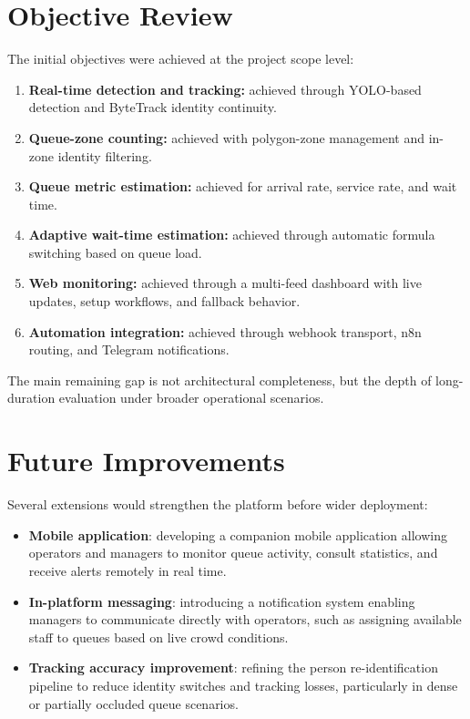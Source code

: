 \section{Objective Review}
The initial objectives were achieved at the project scope level:
\begin{enumerate}
    \item \textbf{Real-time detection and tracking:} achieved through YOLO-based detection and ByteTrack identity continuity.
    \item \textbf{Queue-zone counting:} achieved with polygon-zone management and in-zone identity filtering.
    \item \textbf{Queue metric estimation:} achieved for arrival rate, service rate, and wait time.
    \item \textbf{Adaptive wait-time estimation:} achieved through automatic formula switching based on queue load.
    \item \textbf{Web monitoring:} achieved through a multi-feed dashboard with live updates, setup workflows, and fallback behavior.
    \item \textbf{Automation integration:} achieved through webhook transport, n8n routing, and Telegram notifications.
\end{enumerate}

The main remaining gap is not architectural completeness, but the depth of long-duration evaluation under broader operational scenarios.

\section{Future Improvements}
Several extensions would strengthen the platform before wider deployment:
\begin{itemize}
    \item \textbf{Mobile application}: developing a companion mobile application allowing operators and managers to monitor queue activity, consult statistics, and receive alerts remotely in real time.
    \item \textbf{In-platform messaging}: introducing a notification system enabling managers to communicate directly with operators, such as assigning available staff to queues based on live crowd conditions.
    \item \textbf{Tracking accuracy improvement}: refining the person re-identification pipeline to reduce identity switches and tracking losses, particularly in dense or partially occluded queue scenarios.
\end{itemize}

